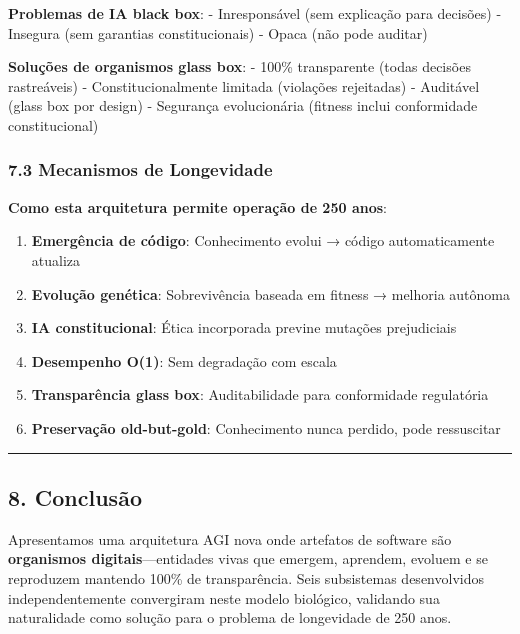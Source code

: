\documentclass[
]{article}
\providecommand{\tightlist}{%
  \setlength{\itemsep}{0pt}\setlength{\parskip}{0pt}}
\begin{document}
\textbf{Problemas de IA black box}: - Inresponsável (sem explicação para
decisões) - Insegura (sem garantias constitucionais) - Opaca (não pode
auditar)

\textbf{Soluções de organismos glass box}: - 100\% transparente (todas
decisões rastreáveis) - Constitucionalmente limitada (violações
rejeitadas) - Auditável (glass box por design) - Segurança evolucionária
(fitness inclui conformidade constitucional)

\subsubsection{7.3 Mecanismos de
Longevidade}\label{mecanismos-de-longevidade}

\textbf{Como esta arquitetura permite operação de 250 anos}:

\begin{enumerate}
\def\labelenumi{\arabic{enumi}.}
\tightlist
\item
  \textbf{Emergência de código}: Conhecimento evolui → código
  automaticamente atualiza
\item
  \textbf{Evolução genética}: Sobrevivência baseada em fitness →
  melhoria autônoma
\item
  \textbf{IA constitucional}: Ética incorporada previne mutações
  prejudiciais
\item
  \textbf{Desempenho O(1)}: Sem degradação com escala
\item
  \textbf{Transparência glass box}: Auditabilidade para conformidade
  regulatória
\item
  \textbf{Preservação old-but-gold}: Conhecimento nunca perdido, pode
  ressuscitar
\end{enumerate}

\begin{center}\rule{0.5\linewidth}{0.5pt}\end{center}

\subsection{8. Conclusão}\label{conclusuxe3o}

Apresentamos uma arquitetura AGI nova onde artefatos de software são
\textbf{organismos digitais}---entidades vivas que emergem, aprendem,
evoluem e se reproduzem mantendo 100\% de transparência. Seis
subsistemas desenvolvidos independentemente convergiram neste modelo
biológico, validando sua naturalidade como solução para o problema de
longevidade de 250 anos.
\end{document}
